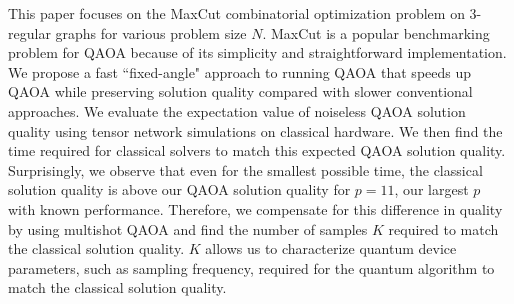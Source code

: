 \documentclass[prb,reprint,nofootinbib,longbibliography,superscriptaddress]{revtex4-1}
\begin{document}
This paper focuses on the MaxCut combinatorial optimization problem on 3-regular graphs for various problem size $N$. MaxCut is a popular benchmarking problem for QAOA because of its simplicity and straightforward implementation.
We propose a fast ``fixed-angle" approach to running QAOA that speeds up QAOA while preserving solution quality compared with slower conventional approaches.
We evaluate the expectation value of noiseless QAOA solution quality using tensor network simulations on classical hardware. We then find the time required for classical solvers to match this expected QAOA solution quality.
Surprisingly, we observe that even for the smallest possible time, the classical solution quality is above our QAOA solution quality for $p=11$, our largest $p$ with known performance.
Therefore, we compensate for this difference in quality by using multishot QAOA and find the number of samples $K$ required to match the classical solution quality.
$K$ allows us to characterize quantum device parameters, such as sampling frequency, required for the quantum algorithm to match the classical solution quality.
\end{document}
